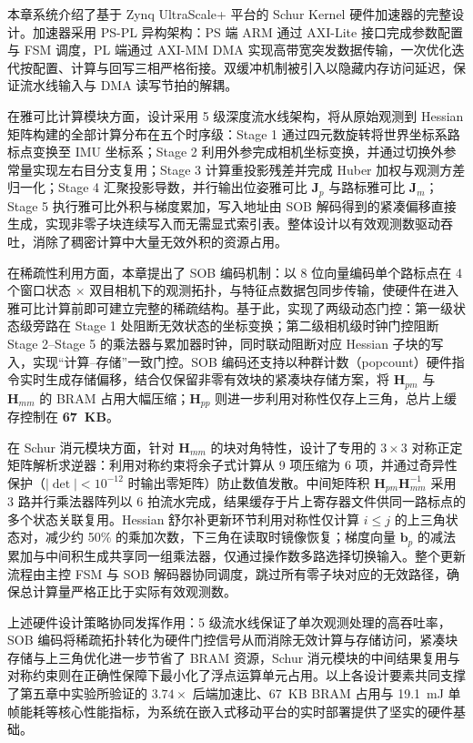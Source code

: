 本章系统介绍了基于 Zynq UltraScale+ 平台的 Schur Kernel 硬件加速器的完整设计。加速器采用 PS-PL 异构架构：PS 端 ARM 通过 AXI-Lite 接口完成参数配置与 FSM 调度，PL 端通过 AXI-MM DMA 实现高带宽突发数据传输，一次优化迭代按配置、计算与回写三相严格衔接。双缓冲机制被引入以隐藏内存访问延迟，保证流水线输入与 DMA 读写节拍的解耦。

在雅可比计算模块方面，设计采用 5 级深度流水线架构，将从原始观测到 Hessian 矩阵构建的全部计算分布在五个时序级：Stage 1 通过四元数旋转将世界坐标系路标点变换至 IMU 坐标系；Stage 2 利用外参完成相机坐标变换，并通过切换外参常量实现左右目分支复用；Stage 3 计算重投影残差并完成 Huber 加权与观测方差归一化；Stage 4 汇聚投影导数，并行输出位姿雅可比 $\mathbf{J}_p$ 与路标雅可比 $\mathbf{J}_m$；Stage 5 执行雅可比外积与梯度累加，写入地址由 SOB 解码得到的紧凑偏移直接生成，实现非零子块连续写入而无需显式索引表。整体设计以有效观测数驱动吞吐，消除了稠密计算中大量无效外积的资源占用。

在稀疏性利用方面，本章提出了 SOB 编码机制：以 8 位向量编码单个路标点在 4 个窗口状态 $\times$ 双目相机下的观测拓扑，与特征点数据包同步传输，使硬件在进入雅可比计算前即可建立完整的稀疏结构。基于此，实现了两级动态门控：第一级状态级旁路在 Stage 1 处阻断无效状态的坐标变换；第二级相机级时钟门控阻断 Stage 2--Stage 5 的乘法器与累加器时钟，同时联动阻断对应 Hessian 子块的写入，实现“计算--存储”一致门控。SOB 编码还支持以种群计数（popcount）硬件指令实时生成存储偏移，结合仅保留非零有效块的紧凑块存储方案，将 $\mathbf{H}_{pm}$ 与 $\mathbf{H}_{mm}$ 的 BRAM 占用大幅压缩；$\mathbf{H}_{pp}$ 则进一步利用对称性仅存上三角，总片上缓存控制在 \textbf{67~KB}。

在 Schur 消元模块方面，针对 $\mathbf{H}_{mm}$ 的块对角特性，设计了专用的 $3\times3$ 对称正定矩阵解析求逆器：利用对称约束将余子式计算从 9 项压缩为 6 项，并通过奇异性保护（$|\det| < 10^{-12}$ 时输出零矩阵）防止数值发散。中间矩阵积 $\mathbf{H}_{pm}\mathbf{H}_{mm}^{-1}$ 采用 3 路并行乘法器阵列以 6 拍流水完成，结果缓存于片上寄存器文件供同一路标点的多个状态关联复用。Hessian 舒尔补更新环节利用对称性仅计算 $i\leq j$ 的上三角状态对，减少约 50\% 的乘加次数，下三角在读取时镜像恢复；梯度向量 $\mathbf{b}_p$ 的减法累加与中间积生成共享同一组乘法器，仅通过操作数多路选择切换输入。整个更新流程由主控 FSM 与 SOB 解码器协同调度，跳过所有零子块对应的无效路径，确保总计算量严格正比于实际有效观测数。

上述硬件设计策略协同发挥作用：5 级流水线保证了单次观测处理的高吞吐率，SOB 编码将稀疏拓扑转化为硬件门控信号从而消除无效计算与存储访问，紧凑块存储与上三角优化进一步节省了 BRAM 资源，Schur 消元模块的中间结果复用与对称约束则在正确性保障下最小化了浮点运算单元占用。以上各设计要素共同支撑了第五章中实验所验证的 $3.74\times$ 后端加速比、67~KB BRAM 占用与 19.1~mJ 单帧能耗等核心性能指标，为系统在嵌入式移动平台的实时部署提供了坚实的硬件基础。

